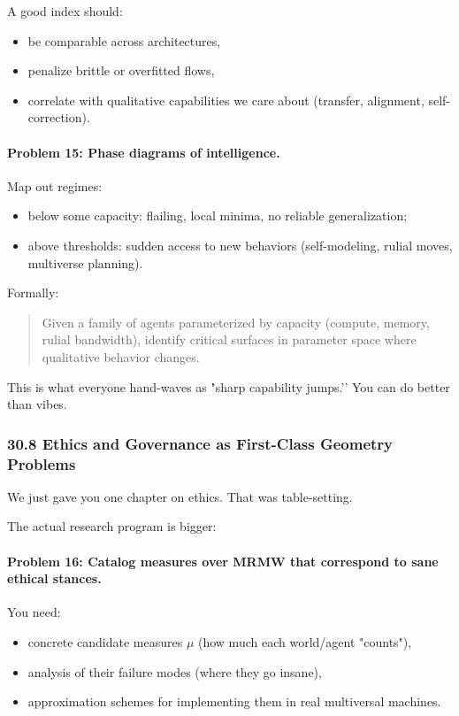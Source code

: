 A good index should:

\begin{itemize}
  \item be comparable across architectures,
  \item penalize brittle or overfitted flows,
  \item correlate with qualitative capabilities we care about (transfer, alignment, self-correction).
\end{itemize}

\paragraph{Problem 15: Phase diagrams of intelligence.}

Map out regimes:

\begin{itemize}
  \item below some capacity: flailing, local minima, no reliable generalization;
  \item above thresholds: sudden access to new behaviors (self-modeling, rulial moves, multiverse planning).
\end{itemize}

Formally:

\begin{quote}
Given a family of agents parameterized by capacity (compute, memory, rulial bandwidth), identify critical surfaces in parameter space where qualitative behavior changes.
\end{quote}

This is what everyone hand-waves as "sharp capability jumps.’’
You can do better than vibes.

\subsubsection*{30.8  Ethics and Governance as First-Class Geometry Problems}

We just gave you one chapter on ethics. That was table-setting.

The actual research program is bigger:

\paragraph{Problem 16: Catalog measures over MRMW that correspond to sane ethical stances.}

You need:

\begin{itemize}
  \item concrete candidate measures $\mu$ (how much each world/agent "counts"),
  \item analysis of their failure modes (where they go insane),
  \item approximation schemes for implementing them in real multiversal machines.
\end{itemize}

